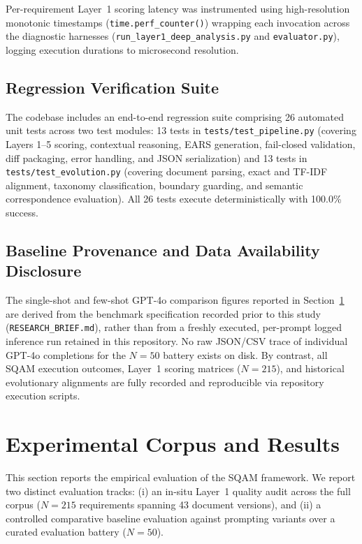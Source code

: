 \documentclass[journal]{IEEEtran}
\begin{document}
Per-requirement Layer~1 scoring latency was instrumented using high-resolution monotonic timestamps (\texttt{time.perf\_counter()}) wrapping each invocation across the diagnostic harnesses (\texttt{run\_layer1\_deep\_analysis.py} and \texttt{evaluator.py}), logging execution durations to microsecond resolution.

\subsection{Regression Verification Suite}
\label{sec:test-suite}

The codebase includes an end-to-end regression suite comprising 26 automated unit tests across two test modules: 13 tests in \texttt{tests/test\_pipeline.py} (covering Layers 1--5 scoring, contextual reasoning, EARS generation, fail-closed validation, diff packaging, error handling, and JSON serialization) and 13 tests in \texttt{tests/test\_evolution.py} (covering document parsing, exact and TF-IDF alignment, taxonomy classification, boundary guarding, and semantic correspondence evaluation). All 26 tests execute deterministically with 100.0\% success.

\subsection{Baseline Provenance and Data Availability Disclosure}
\label{sec:baseline-provenance}

The single-shot and few-shot GPT-4o comparison figures reported in Section~\ref{sec:results} are derived from the benchmark specification recorded prior to this study (\texttt{RESEARCH\_BRIEF.md}), rather than from a freshly executed, per-prompt logged inference run retained in this repository. No raw JSON/CSV trace of individual GPT-4o completions for the $N=50$ battery exists on disk. By contrast, all SQAM execution outcomes, Layer~1 scoring matrices ($N=215$), and historical evolutionary alignments are fully recorded and reproducible via repository execution scripts.

\section{Experimental Corpus and Results}
\label{sec:results}

This section reports the empirical evaluation of the SQAM framework. We report two distinct evaluation tracks: (i) an in-situ Layer~1 quality audit across the full corpus ($N=215$ requirements spanning 43 document versions), and (ii) a controlled comparative baseline evaluation against prompting variants over a curated evaluation battery ($N=50$).
\end{document}
